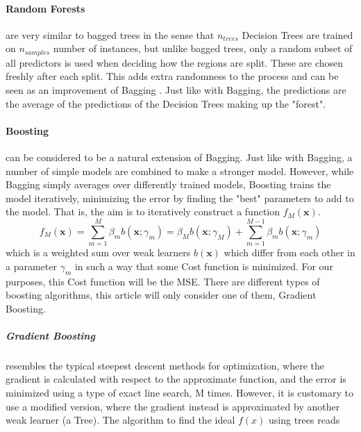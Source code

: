 \documentclass[11pt,a4paper,notitlepage]{article}
\begin{document}
\paragraph{Random Forests} are very similar to bagged trees in the sense that $n_{trees}$ Decision Trees are trained on $n_{samples}$ number of instances, but unlike bagged trees, only a random subset of all predictors is used when deciding how the regions are split. These are chosen freshly after each split.  This adds extra randomness to the process and can be seen as an improvement of Bagging \citep{MortenLectureNotes}. Just like with Bagging, the predictions are the average of the predictions of the Decision Trees making up the "forest". 
\paragraph{Boosting} can be considered to be a natural extension of Bagging. Just like with Bagging, a number of simple models are combined to make a stronger model. However, while Bagging simply averages over differently trained models, Boosting trains the model iteratively, minimizing the error by finding the "best" parameters to add to the model. That is, the aim is to iteratively construct a function $f_M(\boldsymbol{x})$. 
\begin{equation}
    f_M(\boldsymbol{x}) = \sum_{m=1}^M \beta_m b(\boldsymbol{x};\gamma_m)=\beta_M b(\boldsymbol{x};\gamma_M)+ \sum_{m=1}^{M-1} \beta_m b(\boldsymbol{x};\gamma_m)
\end{equation}
which is a weighted sum over weak learners $b(\boldsymbol{x})$ which differ from each other in a parameter $\gamma_m$ in such a way that some Cost function is minimized. 
For our purposes, this Cost function will be the MSE. There are different types of boosting algorithms, this article will only consider one of them, Gradient Boosting.
\subparagraph{Gradient Boosting} resembles the typical steepest descent methods for optimization, where the gradient is calculated with respect to the approximate function, and the error is minimized using a type of exact line search, M times. However, it is customary to use a modified version, where the gradient instead is approximated by another weak learner (a Tree). The algorithm to find the ideal $f(x)$ using trees reads \citep{hastie}
\end{document}
